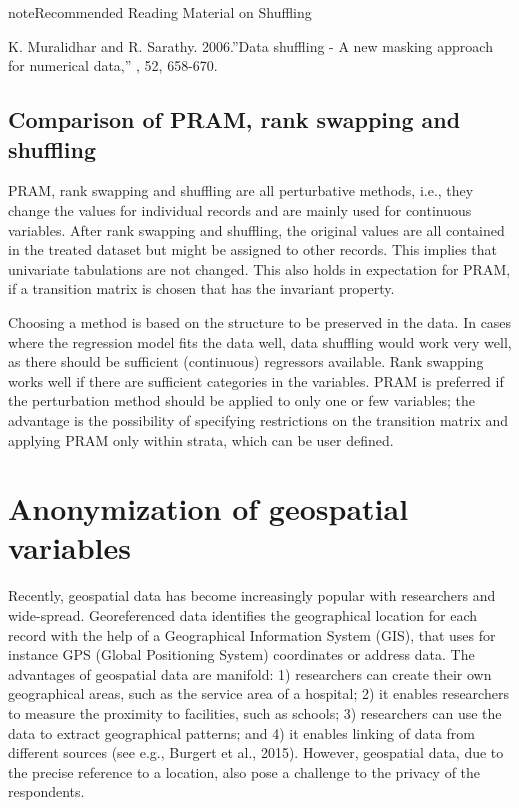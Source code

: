 \documentclass[letterpaper,10pt,english]{sphinxmanual}
\begin{document}
\begin{sphinxadmonition}{note}{Recommended Reading Material on Shuffling}

K. Muralidhar and R. Sarathy. 2006.”Data shuffling - A new masking
approach for numerical data,” , 52, 658-670.
\end{sphinxadmonition}


\subsection{Comparison of PRAM, rank swapping and shuffling}
\label{\detokenize{anon_methods:comparison-of-pram-rank-swapping-and-shuffling}}
PRAM, rank swapping and shuffling are all perturbative methods, i.e.,
they change the values for individual records and are mainly used for
continuous variables. After rank swapping and shuffling, the original
values are all contained in the treated dataset but might be assigned to
other records. This implies that univariate tabulations are not changed.
This also holds in expectation for PRAM, if a transition matrix is
chosen that has the invariant property.

Choosing a method is based on the structure to be preserved in the data.
In cases where the regression model fits the data well, data shuffling
would work very well, as there should be sufficient (continuous)
regressors available. Rank swapping works well if there are sufficient
categories in the variables. PRAM is preferred if the perturbation
method should be applied to only one or few variables; the advantage is
the possibility of specifying restrictions on the transition matrix and
applying PRAM only within strata, which can be user defined.


\section{Anonymization of geospatial variables}
\label{\detokenize{anon_methods:anonymization-of-geospatial-variables}}
Recently, geospatial data has become increasingly popular with
researchers and wide-spread. Georeferenced data identifies the
geographical location for each record with the help of a Geographical
Information System (GIS), that uses for instance GPS (Global Positioning
System) coordinates or address data. The advantages of geospatial data
are manifold: 1) researchers can create their own geographical areas,
such as the service area of a hospital; 2) it enables researchers to
measure the proximity to facilities, such as schools; 3) researchers can
use the data to extract geographical patterns; and 4) it enables linking
of data from different sources (see e.g., Burgert et al., 2015).
However, geospatial data, due to the precise reference to a location,
also pose a challenge to the privacy of the respondents.
\end{document}
